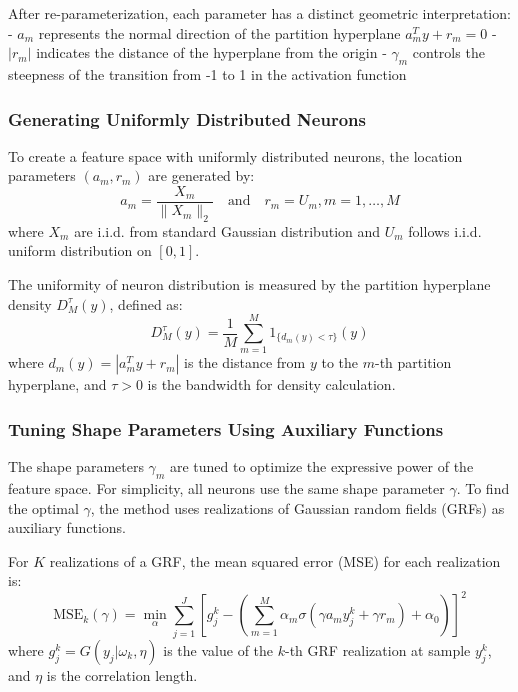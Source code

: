 \documentclass[11pt]{article}
\begin{document}
After re-parameterization, each parameter has a distinct geometric interpretation:
- $a_m$ represents the normal direction of the partition hyperplane $a_m^T y + r_m = 0$
- $|r_m|$ indicates the distance of the hyperplane from the origin
- $\gamma_m$ controls the steepness of the transition from -1 to 1 in the activation function

\subsubsection{Generating Uniformly Distributed Neurons}

To create a feature space with uniformly distributed neurons, the location parameters $(a_m, r_m)$ are generated by:
\begin{equation}
a_m = \frac{X_m}{\|X_m\|_2} \quad \text{and} \quad r_m = U_m, m = 1, \ldots, M
\end{equation}
where $X_m$ are i.i.d. from standard Gaussian distribution and $U_m$ follows i.i.d. uniform distribution on $[0, 1]$.

The uniformity of neuron distribution is measured by the partition hyperplane density $D_M^\tau(y)$, defined as:
\begin{equation}
D_M^\tau(y) = \frac{1}{M}\sum_{m=1}^M 1_{\{d_m(y) < \tau\}}(y)
\end{equation}
where $d_m(y) = |a_m^T y + r_m|$ is the distance from $y$ to the $m$-th partition hyperplane, and $\tau > 0$ is the bandwidth for density calculation.

\subsubsection{Tuning Shape Parameters Using Auxiliary Functions}

The shape parameters $\gamma_m$ are tuned to optimize the expressive power of the feature space. For simplicity, all neurons use the same shape parameter $\gamma$. To find the optimal $\gamma$, the method uses realizations of Gaussian random fields (GRFs) as auxiliary functions.

For $K$ realizations of a GRF, the mean squared error (MSE) for each realization is:
\begin{equation}
\text{MSE}_k(\gamma) = \min_\alpha \sum_{j=1}^J \left[g_j^k - \left(\sum_{m=1}^M \alpha_m \sigma(\gamma a_m y_j^k + \gamma r_m) + \alpha_0\right) \right]^2
\end{equation}
where $g_j^k = G(y_j|\omega_k, \eta)$ is the value of the $k$-th GRF realization at sample $y_j^k$, and $\eta$ is the correlation length.
\end{document}

